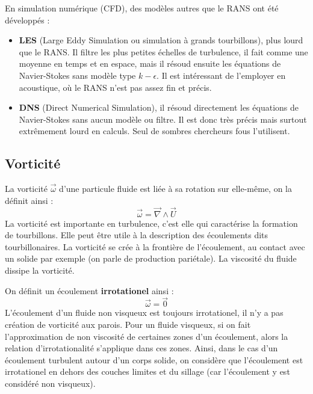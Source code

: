 En simulation numérique (CFD), des modèles autres que le RANS ont été développés :
%
\begin{itemize}
    \item \textbf{LES} (Large Eddy Simulation ou simulation à grands tourbillons), plus lourd que le RANS. Il filtre les plus petites échelles de turbulence, il fait comme une moyenne en temps et en espace, mais il résoud ensuite les équations de Navier-Stokes sans modèle type $k-\epsilon$. Il est intéressant de l'employer en acoustique, où le RANS n'est pas assez fin et précis.
    \item \textbf{DNS} (Direct Numerical Simulation), il résoud directement les équations de Navier-Stokes sans aucun modèle ou filtre. Il est donc très précis mais surtout extrêmement lourd en calculs. Seul de sombres chercheurs fous l'utilisent.
\end{itemize}

\subsection*{Vorticité}

La vorticité $\vec{\omega}$ d'une particule fluide est liée à sa rotation sur elle-même, on la définit ainsi :
%
\begin{equation}
    \vec{\omega} = \vec{\nabla} \wedge \vec{U}
\end{equation}
%
La vorticité est importante en turbulence, c'est elle qui caractérise la formation de tourbillons. Elle peut être utile à la description des écoulements dits tourbillonaires. La vorticité se crée à la frontière de l'écoulement, au contact avec un solide par exemple (on parle de production pariétale). La viscosité du fluide dissipe la vorticité.

On définit un écoulement \textbf{irrotationel} ainsi :
%
\begin{equation}
    \vec{\omega} = \vec{0}
\end{equation}
%
L'écoulement d'un fluide non visqueux est toujours irrotationel, il n'y a pas création de vorticité aux parois. Pour un fluide visqueux, si on fait l'approximation de non viscosité de certaines zones d'un écoulement, alors la relation d'irrotationalité s'applique dans ces zones. Ainsi, dans le cas d'un écoulement turbulent autour d'un corps solide, on considère que l'écoulement est irrotationel en dehors des couches limites et du sillage (car l'écoulement y est considéré non visqueux).

